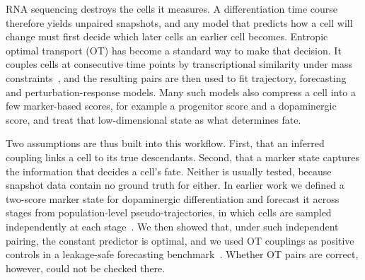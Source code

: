 \documentclass[10pt,journal,compsoc]{IEEEtran}
\begin{document}
\maketitle
\IEEEdisplaynontitleabstractindextext
\IEEEpeerreviewmaketitle

 RNA sequencing destroys the cells it measures. A
differentiation time course therefore yields unpaired snapshots, and any model that predicts
how a cell will change must first decide which later cells an earlier cell becomes.
Entropic optimal transport (OT) has become a standard way to make that decision. It couples
cells at consecutive time points by transcriptional similarity under mass
constraints~\cite{Cuturi_2013,Schiebinger_2019,Chizat_2018}, and the resulting pairs are
then used to fit trajectory, forecasting and perturbation-response models. Many such
models also compress a cell into a few marker-based scores, for example a progenitor score
and a dopaminergic score, and treat that low-dimensional state as what determines fate.

Two assumptions are thus built into this workflow. First, that an inferred coupling links a
cell to its true descendants. Second, that a marker state captures the information that
decides a cell's fate. Neither is usually tested, because snapshot data contain no ground
truth for either. In earlier work we defined a two-score marker state for dopaminergic
differentiation and forecast it across stages from population-level pseudo-trajectories,
in which cells are sampled independently at each stage~\cite{Kanu_ICUFN2026}. We then
showed that, under such independent pairing, the constant predictor is optimal, and we used
OT couplings as positive controls in a leakage-safe forecasting
benchmark~\cite{Kanu_TCBB}. Whether OT pairs are correct, however, could not be checked
there.
\end{document}
